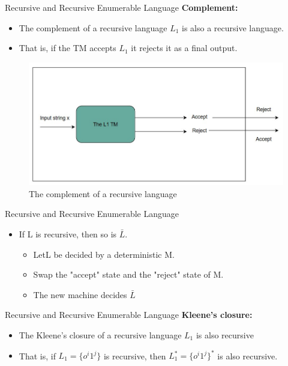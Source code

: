 \documentclass{beamer}
\begin{document}
\begin{frame}{Recursive and Recursive Enumerable Language}
	\textbf{Complement:}
	\begin{itemize}
		\item  The complement of a recursive language $L_1$ is also a recursive language. \item That is, if the TM accepts $L_1$ it rejects it as a final output.
	\end{itemize}
	\begin{figure}
		\includegraphics[scale=.4]{img5/m33}
		\caption{The complement of a recursive language}
	\end{figure}

\end{frame}
\begin{frame}{Recursive and Recursive Enumerable Language}
	\begin{itemize}
		\item If L is recursive, then so is $\bar{L}$.
		\begin{itemize}
			\item LetL be decided by a deterministic M.
			\item Swap the "accept" state and the "reject" state of	M.
			\item The new machine decides	$\bar{L}$
		\end{itemize}
	\end{itemize}
\end{frame}
\begin{frame}{Recursive and Recursive Enumerable Language}
	\textbf{Kleene's closure:}
	\begin{itemize}
		\item The Kleene's closure of a recursive language $L_1$  is also recursive 
		 \item That is, if $L_1=\{o^i1^j\}$ is recursive, then $L_1^*=\{o^i1^j\}^*$  is also recursive.
	\end{itemize}
\end{frame}
\end{document}
